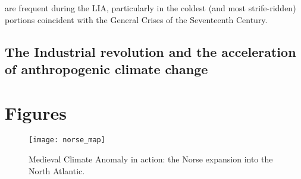 are frequent during the LIA, particularly in the coldest (and most strife-ridden) portions coincident with the General Crises of the Seventeenth Century. 

   
\subsection{The Industrial revolution and the acceleration of anthropogenic climate change}

\clearpage 
\section{Figures}

\begin{figure}
\begin{center}
	\texttt{[image: norse\_map]}%
	\caption{Medieval Climate Anomaly in action: the Norse expansion into the North Atlantic.}
	\label{fig:norse_map}
\end{center}
\end{figure}



